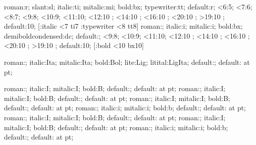 
%
    {roman:r; slant:sl; italic:ti; mitalic:mi; bold:bx; typewriter:tt;
     default:r;}%
    {<6:5; <7:6; <8:7; <9:8; <10:9; <11:10; <12:10 \sc@led\magstephalf;
     <14:10 \sc@led{}; <16:10 \sc@led{};
     <20:10 \sc@led{}; >19:10 \sc@led{};
     default:10;}%
    [\ifStyle:italic \ifnum\Fsize<7 ti7\fi\fi
     \ifStyle:typewriter \ifnum\Fsize<8 tt8\fi\fi]
%
    {roman:; italic:i; mitalic:i; bold:bx; demiboldcondensed:dc;
     default:;}%
    {<9:8; <10:9; <11:10; <12:10 \sc@led\magstephalf;
     <14:10 \sc@led{}; <16:10 \sc@led{};
     <20:10 \sc@led{}; >19:10 \sc@led{};
     default:10;}%
    [\ifStyle:bold \ifnum\Fsize<10 bx10\fi\fi]

 {roman:; italic:Ita; mitalic:Ita; bold:Bol; 
  lite:Lig; litital:LigIta; default:;}
 {default: at \Fsize pt;}

    {roman:; italic:I; mitalic:I; bold:B; default:;}
    {default: at \Fsize pt;}
    {roman:; italic:I; mitalic:I; bold:B; default:;}
    {default: at \Fsize pt;}
    {roman:; italic:I; mitalic:I; bold:B; default:;}
    {default: at \Fsize pt;}
    {roman:; italic:i; mitalic:i; bold:b; default:;}
    {default: at \Fsize pt;}
    {roman:; italic:I; mitalic:I; bold:B; default:;}
    {default: at \Fsize pt;}
    {roman:; italic:I; mitalic:I; bold:B; default:;}
    {default: at \Fsize pt;}
    {roman:; italic:i; mitalic:i; bold:b; default:;}
    {default: at \Fsize pt;}

\endinput
